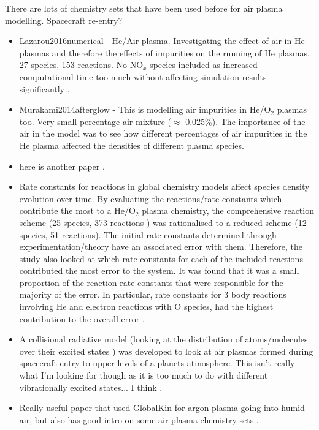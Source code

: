 \documentclass[11pt, oneside]{article}   	%
\begin{document}
There are lots of chemistry sets that have been used before for air plasma modelling.
Spacecraft re-entry? 
\begin{itemize}
\item Lazarou2016numerical - He/Air plasma. Investigating the effect of air in He plasmas and therefore the effects of impurities on the running of He plasmas. 27 species, 153 reactions. No NO$_x$ species included as increased computational time too much without affecting simulation results significantly \cite{Lazarou2016numerical}.
\item Murakami2014afterglow -  This is modelling air impurities in He/O$_2$ plasmas too. Very small percentage air mixture ($\approx$ 0.025\%). The importance of the air in the model was to see how different percentages of air impurities in the He plasma affected the densities of different plasma species.\cite{Murakami2014afterglow}
\item here is another paper \cite{Gordiets1995kinetic}.
\item Rate constants for reactions in global chemistry models affect species density evolution over time. 
By evaluating the reactions/rate constants which contribute the most to a He/O$_2$ plasma chemistry, the comprehensive reaction scheme (25 species, 373 reactions \cite{Turner2015uncertainty}) was rationalised to a reduced scheme (12 species, 51 reactions). The initial rate constants determined through experimentation/theory have an associated error with them. Therefore, the study also looked at which rate constants for each of the included reactions contributed the most error to the system. It was found that it was a small proportion of the reaction rate constants that were responsible for the majority of the error. In particular, rate constants for 3 body reactions involving He and electron reactions with O species, had the highest contribution to the overall error \cite{Turner2016uncertainty}.
\item A collisional radiative model (looking at the distribution of atoms/molecules over their excited states \cite{Sijde1984collisional}) was developed to look at air plasmas formed during spacecraft entry to upper levels of a planets atmosphere. This isn't really what I'm looking for though as it is too much to do with different vibrationally excited states... I think \cite{Bultel2006collisional}.
\item Really useful paper that used GlobalKin for argon plasma going into humid air, but also has good intro on some air plasma chemistry sets \cite{Gaens2013kinetic}.

\end{itemize}
\end{document}
